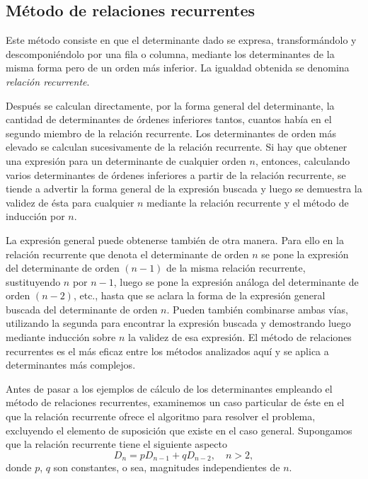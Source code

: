\subsection*{Método de relaciones recurrentes}

Este método consiste en que el determinante dado se expresa, transformándolo y descomponiéndolo por una fila o columna, mediante los determinantes de la misma forma pero de un orden más inferior. La igualdad obtenida se denomina \emph{relación recurrente}.

Después se calculan directamente, por la forma general del determinante, la cantidad de determinantes de órdenes inferiores tantos, cuantos había en el segundo miembro de la relación recurrente. Los determinantes de orden más elevado se calculan sucesivamente de la relación recurrente. Si hay que obtener una expresión para un determinante de cualquier orden $n$, entonces, calculando varios determinantes de órdenes inferiores a partir de la relación recurrente, se tiende a advertir la forma general de la expresión buscada y luego se demuestra la validez de ésta para cualquier $n$ mediante la relación recurrente y el método de inducción por $n$.

La expresión general puede obtenerse también de otra manera. Para ello en la relación recurrente que denota el determinante de orden $n$ se pone la expresión del determinante de orden $(n - 1)$ de la misma relación recurrente, sustituyendo $n$ por $n - 1$, luego se pone la expresión análoga del determinante de orden $(n - 2)$, etc., hasta que se aclara la forma de la expresión general buscada del determinante de orden $n$. Pueden también combinarse ambas vías, utilizando la segunda para encontrar la expresión buscada y demostrando luego mediante inducción sobre $n$ la validez de esa expresión. El método de relaciones recurrentes es el más eficaz entre los métodos analizados aquí y se aplica a determinantes más complejos.

Antes de pasar a los ejemplos de cálculo de los determinantes empleando el método de relaciones recurrentes, examinemos un caso particular de éste en el que la relación recurrente ofrece el algoritmo para resolver el problema, excluyendo el elemento de suposición que existe en el caso general. Supongamos que la relación recurrente tiene el siguiente aspecto
\begin{equation}
    D_n = p D_{n-1} + q D_{n-2}, \quad n > 2, \label{detrecuerrencia1}
\end{equation}
donde $p$, $q$ son constantes, o sea, magnitudes independientes de $n$.

